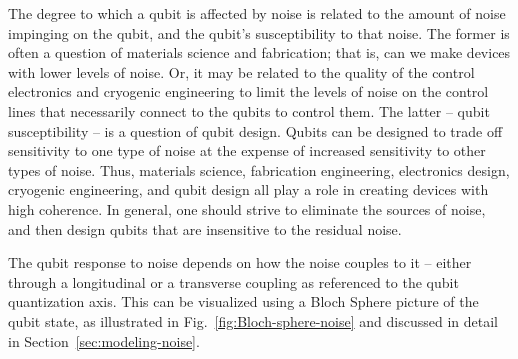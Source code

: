 \documentclass[aip,apr,twocolumn,showpacs,superscriptaddress,groupedaddress,nofootinbib,reprint]{revtex4-1}  %
\begin{document}
%
The degree to which a qubit is affected by noise is related to the amount of noise impinging on the qubit, and the qubit's susceptibility to that noise. The former is often a question of materials science and fabrication; that is, can we make devices with lower levels of noise. Or, it may be related to the quality of the control electronics and cryogenic engineering to limit the levels of noise on the control lines that necessarily connect to the qubits to control them. The latter -- qubit susceptibility -- is a question of qubit design. Qubits can be designed to trade off sensitivity to one type of noise at the expense of increased sensitivity to other types of noise. Thus, materials science, fabrication engineering, electronics design, cryogenic engineering, and qubit design all play a role in creating devices with high coherence. In general, one should strive to eliminate the sources of noise, and then design qubits that are insensitive to the residual noise.

The qubit response to noise depends on how the noise couples to it -- either through a longitudinal or a transverse coupling as referenced to the qubit quantization axis. This can be visualized using a Bloch Sphere picture of the qubit state, as illustrated in Fig.~\ref{fig:Bloch-sphere-noise} and discussed in detail in Section~\ref{sec:modeling-noise}.



\end{document}
